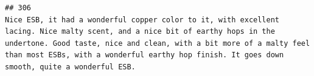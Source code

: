 \documentclass[
  a4paper,
]{article}
\begin{document}
\begin{verbatim}
## 306                                                                                                                                                                                                                                                                                                                                                                                                                                                                                                                                                                                                                                                                                                                                                                                                                                                                                                                                                                                                                                                                                                                                                                                                                                                                                                                                                                                                                                                                      Nice ESB, it had a wonderful copper color to it, with excellent lacing. Nice malty scent, and a nice bit of earthy hops in the undertone. Good taste, nice and clean, with a bit more of a malty feel than most ESBs, with a wonderful earthy hop finish. It goes down smooth, quite a wonderful ESB.

\end{verbatim}
\end{document}
